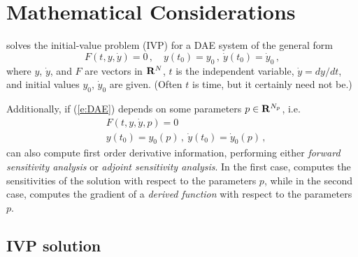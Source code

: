 \chapter{Mathematical Considerations}\label{s:math}

{\idas} solves the initial-value problem (IVP) for a DAE system of the
general form
\begin{equation}\label{e:DAE}
  F(t,y, \dot y) = 0 \, ,
  \quad y(t_0) = y_0 \, ,~ {\dot y}(t_0) = \dot y_0 \, ,
\end{equation}
where $y$, $\dot y$, and $F$ are vectors in ${\bf R}^N$, $t$ is the independent
variable, $\dot y = dy/dt$, and initial values $y_0$, $\dot y_0$ are given.
(Often $t$ is time, but it certainly need not be.)

Additionally, if (\ref{e:DAE}) depends on some parameters $p \in {\bf R}^{N_p}$,
i.e.
\begin{equation}\label{e:DAE_p}
\begin{split}
& F(t, y, \dot y , p) = 0 \\
& y(t_0) = y_0(p) \, ,~ {\dot y}(t_0) = \dot y_0(p) \, ,
\end{split}
\end{equation}
{\idas} can also compute first order derivative information, performing either
{\em forward sensitivity analysis} or {\em adjoint sensitivity analysis}.
In the first case, {\idas} computes the sensitivities of the
solution with respect to the parameters $p$, while in the second case,
{\idas} computes the gradient of a {\em derived function} with
respect to the parameters $p$.


\section{IVP solution}\label{ss:ivp_sol}


